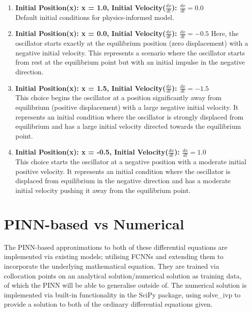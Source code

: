 \documentclass[12pt, openany]{book}
\begin{document}
\begin{enumerate}
    \item \textbf{Initial Position(x): x = 1.0, Initial Velocity($\frac{dx}{dt}$): $\frac{dx}{dt} = 0.0$} \\
    Default initial conditions for physics-informed model.
    \item \textbf{Initial Position(x): x = 0.0, Initial Velocity($\frac{dx}{dt}$): $\frac{dx}{dt} = -0.5$}
    Here, the oscillator starts exactly at the equilibrium position (zero displacement) with a negative initial velocity. This represents a scenario where the oscillator starts from rest at the equilibrium point but with an initial impulse in the negative direction.
    \item \textbf{Initial Position(x): x = 1.5, Initial Velocity($\frac{dx}{dt}$): $\frac{dx}{dt} = -1.5$} \\
    This choice begins the oscillator at a position significantly away from equilibrium (positive displacement) with a large negative initial velocity. It represents an initial condition where the oscillator is strongly displaced from equilibrium and has a large initial velocity directed towards the equilibrium point.
    \item \textbf{Initial Position(x): x = -0.5, Initial Velocity($\frac{dx}{dt}$): $\frac{dx}{dt} = 1.0$} \\
    This choice starts the oscillator at a negative position with a moderate initial positive velocity. It represents an initial condition where the oscillator is displaced from equilibrium in the negative direction and has a moderate initial velocity pushing it away from the equilibrium point.
\end{enumerate}
    
\section{PINN-based vs Numerical}

The PINN-based approximations to both of these differential equations are implemented via existing models; utilising FCNNs and extending them to incorporate the underlying mathematical equation. They are trained via collocation points on an analytical solution/numerical solution as training data, of which the PINN will be able to generalise outside of. The numerical solution is implemented via built-in functionality in the SciPy package, using solve{\_ivp} to provide a solution to both of the ordinary differential equations given.
\end{document}
